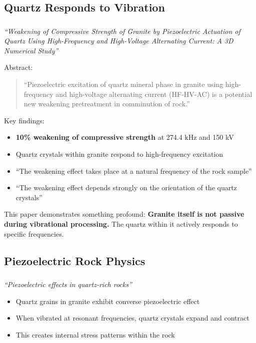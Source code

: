 \documentclass[11pt]{article}
\begin{document}
\subsection{Quartz Responds to Vibration}

\subsubsection{\citet{Saksala2023}}
\textit{``Weakening of Compressive Strength of Granite by Piezoelectric Actuation of Quartz Using High-Frequency and High-Voltage Alternating Current: A 3D Numerical Study''}

Abstract:
\begin{quote}
``Piezoelectric excitation of quartz mineral phase in granite using high-frequency and high-voltage alternating current (HF-HV-AC) is a potential new weakening pretreatment in comminution of rock.''
\end{quote}

Key findings:
\begin{itemize}
    \item \textbf{10\% weakening of compressive strength} at 274.4 kHz and 150 kV
    \item Quartz crystals within granite respond to high-frequency excitation
    \item ``The weakening effect takes place at a natural frequency of the rock sample''
    \item ``The weakening effect depends strongly on the orientation of the quartz crystals''
\end{itemize}

This paper demonstrates something profound: \textbf{Granite itself is not passive during vibrational processing.} The quartz within it actively responds to specific frequencies.

\subsection{Piezoelectric Rock Physics}

\subsubsection{\citet{Bishop1981}}
\textit{``Piezoelectric effects in quartz-rich rocks''}

\begin{itemize}
    \item Quartz grains in granite exhibit converse piezoelectric effect
    \item When vibrated at resonant frequencies, quartz crystals expand and contract
    \item This creates internal stress patterns within the rock
\end{itemize}
\end{document}
